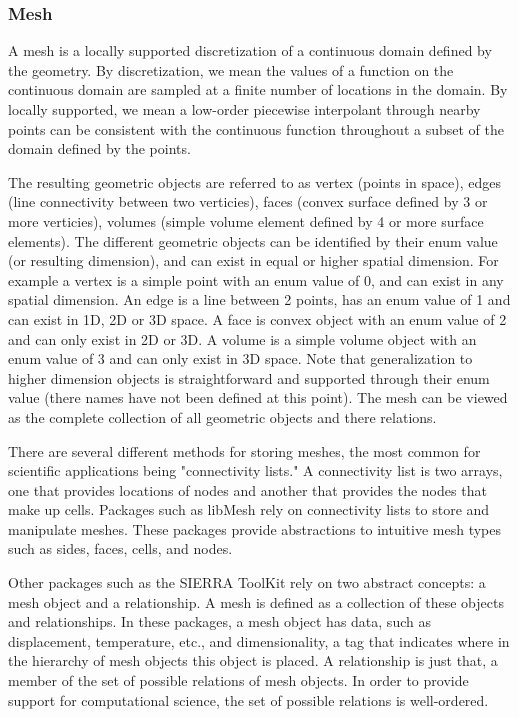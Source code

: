 \documentclass[10pt]{article}
\begin{document}
\subsubsection{Mesh}

A mesh is a locally supported discretization of a continuous domain defined by the geometry.  By discretization, we mean the values of a function on the continuous domain are sampled at a finite number of locations in the domain.  By locally supported, we mean a low-order piecewise interpolant through nearby points can be consistent with the continuous function throughout a subset of the domain defined by the points.  

The resulting geometric objects are referred to as vertex (points in space), edges (line connectivity between two verticies), faces (convex surface defined by 3 or more verticies), volumes (simple volume element defined by 4 or more surface elements).  The different geometric objects can be identified by their enum value (or resulting dimension), and can exist in equal or higher spatial dimension.  For example a vertex is a simple point with an enum value of 0, and can exist in any spatial dimension.  An edge is a line between 2 points, has an enum value of 1 and can exist in 1D, 2D or 3D space.  A face is convex object with an enum value of 2 and can only exist in 2D or 3D.  A volume is a simple volume object with an enum value of 3 and can only exist in 3D space.  Note that generalization to higher dimension objects is straightforward and supported through their enum value (there names have not been defined at this point).  The mesh can be viewed as the complete collection of all geometric objects and there relations.  

There are several different methods for storing meshes, the most common for scientific applications being "connectivity lists."  A connectivity list is two arrays, one that provides locations of nodes and another that provides the nodes that make up cells.  Packages such as {libMesh} rely on connectivity lists to store and manipulate meshes.  These packages provide abstractions to intuitive mesh types such as sides, faces, cells, and nodes.

Other packages such as the {SIERRA ToolKit} rely on two abstract concepts: a mesh object and a relationship.  A mesh is defined as a collection of these objects and relationships.  In these packages, a mesh object has data, such as displacement, temperature, etc., and dimensionality, a tag that indicates where in the hierarchy of mesh objects this object is placed.  A relationship is just that, a member of the set of possible relations of mesh objects.  In order to provide support for computational science, the set of possible relations is well-ordered.
\end{document}
